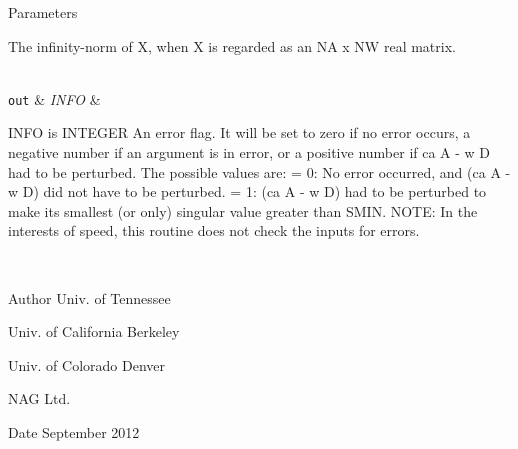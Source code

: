\begin{DoxyParams}[1]{Parameters}
\begin{DoxyVerb}
          The infinity-norm of X, when X is regarded as an NA x NW
          real matrix.\end{DoxyVerb}
\\
\hline
\mbox{\tt out}  & {\em I\+N\+F\+O} & \begin{DoxyVerb}          INFO is INTEGER
          An error flag.  It will be set to zero if no error occurs,
          a negative number if an argument is in error, or a positive
          number if  ca A - w D  had to be perturbed.
          The possible values are:
          = 0: No error occurred, and (ca A - w D) did not have to be
                 perturbed.
          = 1: (ca A - w D) had to be perturbed to make its smallest
               (or only) singular value greater than SMIN.
          NOTE: In the interests of speed, this routine does not
                check the inputs for errors.\end{DoxyVerb}
 \\
\hline
\end{DoxyParams}
\begin{DoxyAuthor}{Author}
Univ. of Tennessee 

Univ. of California Berkeley 

Univ. of Colorado Denver 

N\+A\+G Ltd. 
\end{DoxyAuthor}
\begin{DoxyDate}{Date}
September 2012 
\end{DoxyDate}
